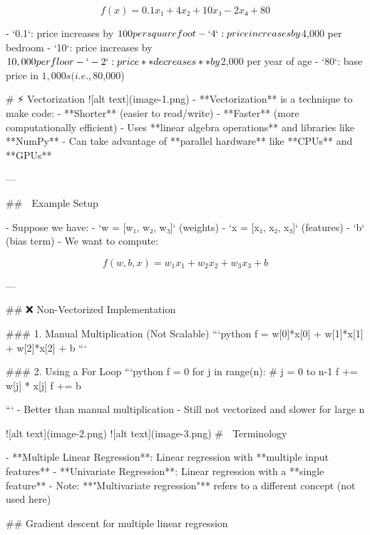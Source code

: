\[
f(x) = 0.1x₁ + 4x₂ + 10x₃ - 2x₄ + 80
\]

- `0.1`: price increases by $100 per square foot
- `4`: price increases by $4,000 per bedroom
- `10`: price increases by $10,000 per floor
- `-2`: price **decreases** by $2,000 per year of age
- `80`: base price in $1,000s (i.e., $80,000)


# ⚡ Vectorization 
![alt text](image-1.png)
- **Vectorization** is a technique to make code:
  - **Shorter** (easier to read/write)
  - **Faster** (more computationally efficient)
- Uses **linear algebra operations** and libraries like **NumPy**
- Can take advantage of **parallel hardware** like **CPUs** and **GPUs**

---

## 🧠 Example Setup

- Suppose we have:
  - `w = [w₁, w₂, w₃]` (weights)
  - `x = [x₁, x₂, x₃]` (features)
  - `b` (bias term)
- We want to compute:
  
  \[
  f(w, b, x) = w_1x_1 + w_2x_2 + w_3x_3 + b
  \]

---

## ❌ Non-Vectorized Implementation

### 1. Manual Multiplication (Not Scalable)
```python
f = w[0]*x[0] + w[1]*x[1] + w[2]*x[2] + b
```


### 2. Using a For Loop
```python
f = 0
for j in range(n):  # j = 0 to n-1
    f += w[j] * x[j]
f += b

```
- Better than manual multiplication
- Still not vectorized and slower for large n

![alt text](image-2.png)
![alt text](image-3.png)
# 🧾 Terminology

- **Multiple Linear Regression**: Linear regression with **multiple input features**
- **Univariate Regression**: Linear regression with a **single feature**
- Note: **"Multivariate regression"** refers to a different concept (not used here)


## Gradient descent for multiple linear regression

